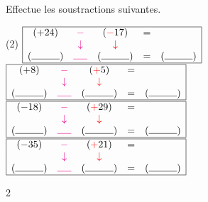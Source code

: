 \documentclass[a4paper,11pt]{report}
\begin{document}
\begin{exop}
{Effectue les soustractions suivantes.
\begin{tasks}(2)
\task $\begin{array}{|ccccc|}\hline
(+24)&{\color{magenta}-}&({\color{red}-}17)&= & \\
& {\color{magenta}\downarrow}&{\color{red}\downarrow} & & \\
(\ligne{1})&{\color{magenta}\ligne{.5}}&(\ligne{1})&=&(\ligne{1})\\\hline
\end{array}$ 
\task $\begin{array}{|ccccc|}\hline
(+8)&{\color{magenta}-}&({\color{red}+}5)&= & \\
& {\color{magenta}\downarrow}&{\color{red}\downarrow} & & \\
(\ligne{1})&{\color{magenta}\ligne{.5}}&(\ligne{1})&=&(\ligne{1})\\\hline
\end{array}$ 
\task $\begin{array}{|ccccc|}\hline
(-18)&{\color{magenta}-}&({\color{red}+}29)&= & \\
& {\color{magenta}\downarrow}&{\color{red}\downarrow} & & \\
(\ligne{1})&{\color{magenta}\ligne{.5}}&(\ligne{1})&=&(\ligne{1})\\\hline
\end{array}$ 
\task $\begin{array}{|ccccc|}\hline
(-35)&{\color{magenta}-}&({\color{red}+}21)&= & \\
& {\color{magenta}\downarrow}&{\color{red}\downarrow} & & \\
(\ligne{1})&{\color{magenta}\ligne{.5}}&(\ligne{1})&=&(\ligne{1})\\\hline
\end{array}$ 
\end{tasks}
}{2}
\end{exop}
\end{document}
